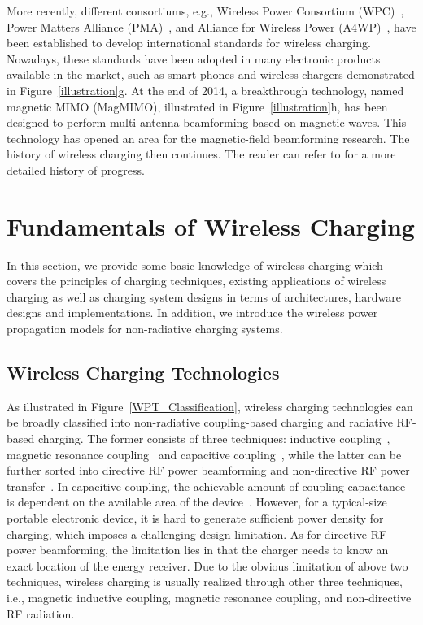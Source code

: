 \documentclass[twocolumn,10pt]{IEEEtran}
\begin{document}
More recently, different consortiums, e.g., Wireless Power Consortium (WPC)~\cite{WPC}, Power Matters Alliance (PMA)~\cite{PMA}, and Alliance for Wireless Power (A4WP)~\cite{WiPower}, have been established to develop international standards for wireless charging. Nowadays, these standards have been adopted in many electronic products available in the market, such as smart phones and wireless chargers demonstrated in Figure~\ref{illustration}g. At the end of 2014, a breakthrough technology, named magnetic MIMO (MagMIMO), illustrated in Figure~\ref{illustration}h, has been designed to perform multi-antenna beamforming based on magnetic waves. This technology has opened an area for the magnetic-field beamforming research. The history of wireless charging then continues. The reader can refer to \cite{C.1984Brown,B.2013Strassner} for a more detailed history of progress.  


\section{Fundamentals of Wireless Charging}

In this section, we provide some basic knowledge of wireless charging which covers the principles of charging techniques, existing applications of wireless charging as well as charging system designs in terms of architectures, hardware designs and implementations. In addition, we introduce the wireless power propagation models for non-radiative charging systems.


\subsection{Wireless Charging Technologies}

As illustrated in Figure~\ref{WPT_Classification}, wireless charging technologies can be broadly classified into non-radiative coupling-based charging and radiative RF-based charging. The former consists of three techniques: inductive coupling~\cite{L.2011Ho}, magnetic resonance coupling~\cite{Kurs2007A} and capacitive coupling~\cite{M.2011Kline}, while the latter can be further sorted into directive RF power beamforming and non-directive RF power transfer~\cite{Z2013Popovic}. 
In capacitive coupling, the achievable amount of coupling capacitance is dependent on the available area of the device~\cite{Y2013Hui}. However, for a typical-size portable electronic device, it is hard to generate sufficient power density for charging, which imposes a challenging design limitation. As for directive RF power beamforming, the limitation lies in that the charger needs to know an exact location of the energy receiver. 
Due to the obvious limitation of above two techniques, wireless charging is usually realized through other three techniques, i.e., magnetic inductive coupling, magnetic resonance coupling, and non-directive RF radiation.
\end{document}
